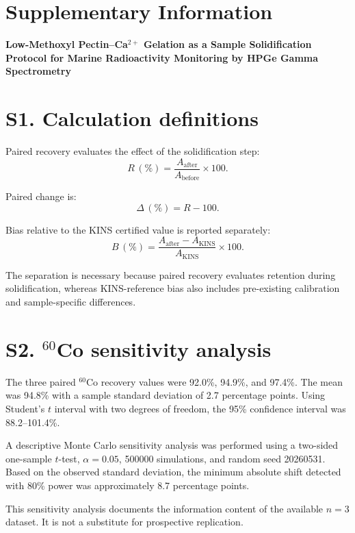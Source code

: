 \documentclass[12pt]{article}
\begin{document}
\section*{Supplementary Information}

\textbf{Low-Methoxyl Pectin--Ca$^{2+}$ Gelation as a Sample
Solidification Protocol for Marine Radioactivity Monitoring
by HPGe Gamma Spectrometry}

\section*{S1. Calculation definitions}

Paired recovery evaluates the effect of the solidification step:
\begin{equation}
R\,(\%) = \frac{A_{\mathrm{after}}}{A_{\mathrm{before}}} \times 100.
\end{equation}

Paired change is:
\begin{equation}
\Delta\,(\%) = R - 100.
\end{equation}

Bias relative to the KINS certified value is reported separately:
\begin{equation}
B\,(\%) =
\frac{A_{\mathrm{after}} - A_{\mathrm{KINS}}}{A_{\mathrm{KINS}}}
\times 100.
\end{equation}

The separation is necessary because paired recovery evaluates retention
during solidification, whereas KINS-reference bias also includes
pre-existing calibration and sample-specific differences.

\section*{S2. $^{60}$Co sensitivity analysis}

The three paired $^{60}$Co recovery values were 92.0\%, 94.9\%, and
97.4\%. The mean was 94.8\% with a sample standard deviation of 2.7
percentage points. Using Student's $t$ interval with two degrees of
freedom, the 95\% confidence interval was 88.2--101.4\%.

A descriptive Monte Carlo sensitivity analysis was performed using a
two-sided one-sample $t$-test, $\alpha=0.05$, 500000 simulations, and
random seed 20260531. Based on the observed standard deviation, the
minimum absolute shift detected with 80\% power was approximately
8.7 percentage points.

This sensitivity analysis documents the information content of the
available $n=3$ dataset. It is not a substitute for prospective
replication.
\end{document}

